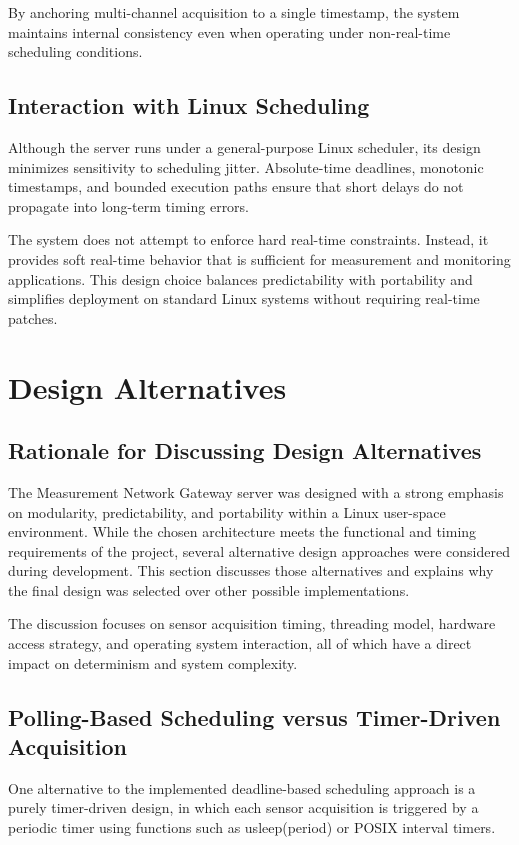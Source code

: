 By anchoring multi-channel acquisition to a single timestamp, the system maintains internal consistency even when operating under non-real-time scheduling conditions.


\subsection{Interaction with Linux Scheduling}
Although the server runs under a general-purpose Linux scheduler, its design minimizes sensitivity to scheduling jitter. Absolute-time deadlines, monotonic timestamps, and bounded execution paths ensure that short delays do not propagate into long-term timing errors.

The system does not attempt to enforce hard real-time constraints. Instead, it provides soft real-time behavior that is sufficient for measurement and monitoring applications. This design choice balances predictability with portability and simplifies deployment on standard Linux systems without requiring real-time patches.


\section{Design Alternatives}
\subsection{Rationale for Discussing Design Alternatives}
The Measurement Network Gateway server was designed with a strong emphasis on modularity, predictability, and portability within a Linux user-space environment. While the chosen architecture meets the functional and timing requirements of the project, several alternative design approaches were considered during development. This section discusses those alternatives and explains why the final design was selected over other possible implementations.

The discussion focuses on sensor acquisition timing, threading model, hardware access strategy, and operating system interaction, all of which have a direct impact on determinism and system complexity.

\subsection{Polling-Based Scheduling versus Timer-Driven Acquisition}
One alternative to the implemented deadline-based scheduling approach is a purely timer-driven design, in which each sensor acquisition is triggered by a periodic timer using functions such as usleep(period) or POSIX interval timers.

